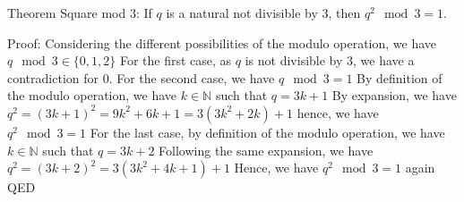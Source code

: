 Theorem Square mod 3:
If $q$ is a natural not divisible by $3$, then $q^2 \mod 3 = 1$.


Proof:
Considering the different possibilities of the modulo operation, we have $q \mod 3 \in \{ 0, 1, 2 \}$
For the first case, as $q$ is not divisible by $3$, we have a contradiction for $0$.
For the second case, we have $q \mod 3 = 1$
    By definition of the modulo operation, we have $k \in \mathbb{N}$ such that $q = 3k + 1$
    By expansion, we have $q^2 = (3k+1)^2 = 9k^2+6k+1 = 3(3k^2 + 2k) + 1$
    hence, we have $q^2 \mod 3 = 1$
For the last case, by definition of the modulo operation, we have $k \in \mathbb{N}$ such that $q = 3k + 2$ 
    Following the same expansion, we have $q^2 = (3k+2)^2 = 3(3k^2+4k+1) +1$
    Hence, we have $q^2 \mod 3 = 1$ again
QED